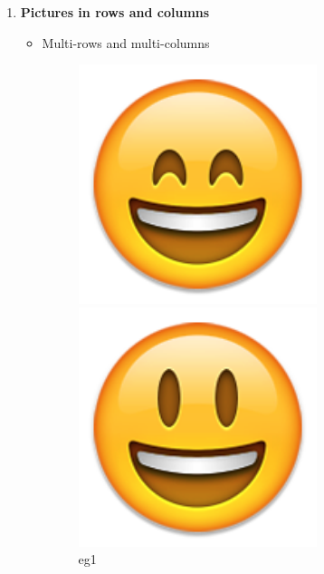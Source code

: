 \begin{solution}
\begin{enumerate}[nosep,label=(\arabic*)]
		\item \textbf{Pictures in rows and columns}
			\begin{itemize}
				\item Multi-rows and multi-columns \\
\begin{latexamplev}[]
\begin{figure}[H]
  \centering
  \begin{minipage}[b]{0.3\textwidth}
	\centering
	\includegraphics[width=0.7\textwidth]{./pic/01.png}
	\caption{eg1}
  \end{minipage}
  \begin{minipage}[b]{0.3\textwidth}
	\centering
	\includegraphics[width=0.7\textwidth]{./pic/02.png}

\end{minipage}
\end{figure}
\end{latexamplev}
\end{itemize}
\end{enumerate}
\end{solution}
